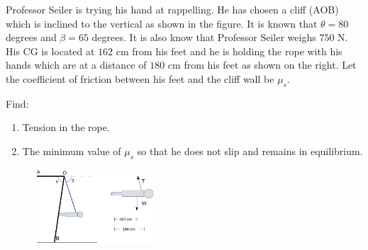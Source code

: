 
Professor Seiler is trying his hand at rappelling. He has chosen a cliff (AOB) which is inclined to the vertical as shown in the figure. It is known that $\theta = 80$ degrees and $\beta = 65$ degrees. It is also know that Professor Seiler weighs $750$ N. His CG is located at $162$ cm from his feet and he is holding the rope with his hands which are at a distance of $180$ cm from his feet as shown on the right. Let the coefficient of friction between his feet and the cliff wall be $\mu_s$.

Find:
\begin{enumerate}
  \item Tension in the rope.
  \item The minimum value of $\mu_s$ so that he does not slip and remains in equilibrium.
\end{enumerate}

\begin{figure}[ht!]
  \centering
  \includegraphics[width=0.4\textwidth,
	           height=0.3\textheight,
		   keepaspectratio]{fig.png}
\end{figure}

